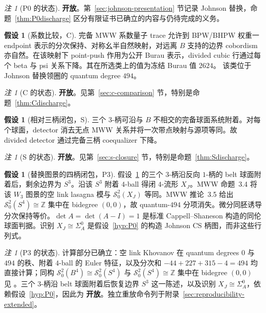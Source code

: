 \documentclass[11pt]{amsart}
\theoremstyle{definition}
\newtheorem{hypothesis}[theorem]{假设}
\theoremstyle{remark}
\newtheorem{remark}[theorem]{注}
\newcommand{\Open}{\textbf{开放}}
\begin{document}
\begin{remark}[P0 的状态]
\Open。第~\ref{sec:johnson-presentation} 节记录 Johnson 替换，命题~\ref{thm:P0discharge} 区分有限证书已确立的内容与仍待完成的义务。
\end{remark}

\begin{hypothesis}[系数比较，C]\label{hyp:P1}
完备 MWW 系数量子 trace 允许到 BPW/BHPW 权重一 endpoint 表示的分次保持、对称幺半自然映射，对远离 $B$ 支持的边界 cobordism 亦自然。在该映射下 point-push 作用为公开 Burau 表示，divided cubic 行通过每个 beta 与 psi 关系下降。其在所选类上的值为冻结 Burau 值 $2624$。
该类位于 Johnson 替换领圈的 quantum degree $494$。
\end{hypothesis}

\begin{remark}[C 的状态]
\Open。见第~\ref{sec:c-comparison} 节，特别是命题~\ref{thm:Cdischarge}。
\end{remark}

\begin{hypothesis}[相对三柄闭包，S]\label{hyp:P2}
三个 $3$-柄可沿与 $B$ 不相交的完备球面系统附着。对每个球面，detector 消去无点 MWW 关系并将一次带点映射与源项等同。故 divided detector 通过完备三柄 coequalizer 下降。
\end{hypothesis}

\begin{remark}[S 的状态]
\Open。见第~\ref{sec:s-closure} 节，特别是命题~\ref{thm:Sdischarge}。
\end{remark}

\begin{hypothesis}[替换图景的四柄闭包，P3]\label{hyp:P3}
假设~\ref{hyp:P2} 的三个 $3$-柄沿反向 $1$-柄的 belt 球面附着后，剩余边界为 $S^3$。沿该 $S^3$ 附着 $4$-ball 得闭 $4$-流形 $X_J$。MWW 命题~3.4 将该 $W_3$ 图景的空 link lasagna 模与 $\mathcal S^2_0(X_J)$ 等同。MWW 推论~3.5 给出 $\mathcal S^2_0(S^4)\cong\mathbb Z$ 集中在 bidegree $(0,0)$，故 quantum-$494$ 分项消失。微分同胚诱导分次保持等价。$\det A=\det(A-I)=1$ 是标准 Cappell--Shaneson 构造的同伦球面判据。识别 $X_J\cong\Sigma_A^0$ 是假设~\ref{hyp:P0} 的构造 Johnson CS 柄图，而非这些行列式。
\end{hypothesis}

\begin{remark}[P3 的状态]
计算部分已确立：空 link Khovanov 在 quantum degrees $0$ 与 $494$ 的秩、附着 $4$-ball 的 Euler 特征，以及分次和 $-44+227+315-4=494$ 均直接计算；同构 $\mathcal S^2_0(B^4)\cong\mathcal S^2_0(S^4)$ 与 $\mathcal S^2_0(S^4)\cong\mathbb Z$ 集中在 bidegree $(0,0)$ 见 \cite[Proposition~3.4 and Corollary~3.5]{ManolescuWalkerWedrich2023}。三个 $3$-柄沿 belt 球面附着后恢复边界 $S^3$ 这一陈述，以及识别 $X_J\cong\Sigma_A^0$，依赖假设~\ref{hyp:P0}，因此为 \Open。独立重放命令列于附录~\ref{sec:reproducibility-extended}。
\end{remark}
\end{document}
